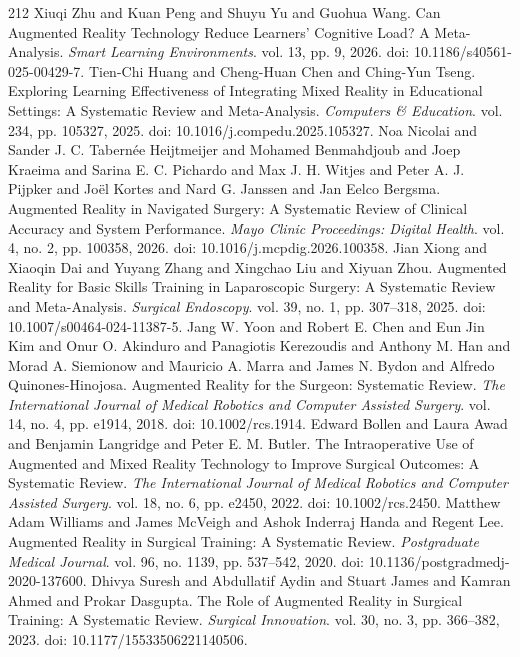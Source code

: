 \begin{thebibliography}{212}
 Xiuqi Zhu and Kuan Peng and Shuyu Yu and Guohua Wang. Can Augmented Reality Technology Reduce Learners' Cognitive Load? A Meta-Analysis. \emph{Smart Learning Environments}. vol. 13, pp. 9, 2026. doi: 10.1186/s40561-025-00429-7.
 Tien-Chi Huang and Cheng-Huan Chen and Ching-Yun Tseng. Exploring Learning Effectiveness of Integrating Mixed Reality in Educational Settings: A Systematic Review and Meta-Analysis. \emph{Computers \& Education}. vol. 234, pp. 105327, 2025. doi: 10.1016/j.compedu.2025.105327.
 Noa Nicolai and Sander J. C. Tabern{\'e}e Heijtmeijer and Mohamed Benmahdjoub and Joep Kraeima and Sarina E. C. Pichardo and Max J. H. Witjes and Peter A. J. Pijpker and Jo{\"e}l Kortes and Nard G. Janssen and Jan Eelco Bergsma. Augmented Reality in Navigated Surgery: A Systematic Review of Clinical Accuracy and System Performance. \emph{Mayo Clinic Proceedings: Digital Health}. vol. 4, no. 2, pp. 100358, 2026. doi: 10.1016/j.mcpdig.2026.100358.
 Jian Xiong and Xiaoqin Dai and Yuyang Zhang and Xingchao Liu and Xiyuan Zhou. Augmented Reality for Basic Skills Training in Laparoscopic Surgery: A Systematic Review and Meta-Analysis. \emph{Surgical Endoscopy}. vol. 39, no. 1, pp. 307--318, 2025. doi: 10.1007/s00464-024-11387-5.
 Jang W. Yoon and Robert E. Chen and Eun Jin Kim and Onur O. Akinduro and Panagiotis Kerezoudis and Anthony M. Han and Morad A. Siemionow and Mauricio A. Marra and James N. Bydon and Alfredo Quinones-Hinojosa. Augmented Reality for the Surgeon: Systematic Review. \emph{The International Journal of Medical Robotics and Computer Assisted Surgery}. vol. 14, no. 4, pp. e1914, 2018. doi: 10.1002/rcs.1914.
 Edward Bollen and Laura Awad and Benjamin Langridge and Peter E. M. Butler. The Intraoperative Use of Augmented and Mixed Reality Technology to Improve Surgical Outcomes: A Systematic Review. \emph{The International Journal of Medical Robotics and Computer Assisted Surgery}. vol. 18, no. 6, pp. e2450, 2022. doi: 10.1002/rcs.2450.
 Matthew Adam Williams and James McVeigh and Ashok Inderraj Handa and Regent Lee. Augmented Reality in Surgical Training: A Systematic Review. \emph{Postgraduate Medical Journal}. vol. 96, no. 1139, pp. 537--542, 2020. doi: 10.1136/postgradmedj-2020-137600.
 Dhivya Suresh and Abdullatif Aydin and Stuart James and Kamran Ahmed and Prokar Dasgupta. The Role of Augmented Reality in Surgical Training: A Systematic Review. \emph{Surgical Innovation}. vol. 30, no. 3, pp. 366--382, 2023. doi: 10.1177/15533506221140506.

\end{thebibliography}
